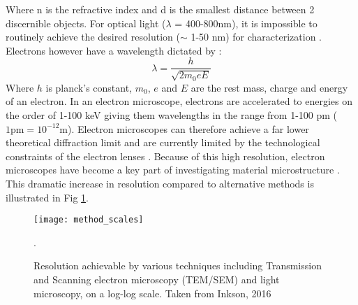 Where n is the refractive index and d is the smallest distance between 2 discernible objects. For optical light ($\lambda$ = 400-800nm), it is impossible to routinely achieve the desired resolution ($\sim$ 1-50 nm) for characterization \cite{rust_sub-diffraction-limit_2006}.  Electrons however have a wavelength dictated by \cite{goldstein_electron_2003}: 
\begin{equation}
 \lambda = \frac{h}{\sqrt{2 m_0 e E}}
\end{equation}
Where $h$ is planck's constant, $m_0$, $e$ and $E$ are the rest mass, charge and energy of an electron.  In an electron microscope, electrons are accelerated to energies on the order of 1-100 keV giving them wavelengths in the range from 1-100 pm ($1\mathrm{pm}=10^{-12}$m).  Electron microscopes can therefore achieve a far lower theoretical diffraction limit  and are currently limited by the technological constraints of the electron  lenses \cite{goldstein_electron_2003}.  Because of this high resolution, electron microscopes have become a key part of investigating material microstructure \cite{inkson_2_2016}.  This dramatic increase in resolution compared to alternative methods is illustrated in Fig \ref{method_scales}. 
\begin{figure}
	\centering
	\texttt{[image: method\_scales]}
	\caption{Resolution achievable by various techniques including Transmission and Scanning electron microscopy (TEM/SEM) and light microscopy, on a log-log scale.  Taken from Inkson, 2016 \cite{inkson_2_2016}}.
	\label{method_scales}
	
\end{figure}


